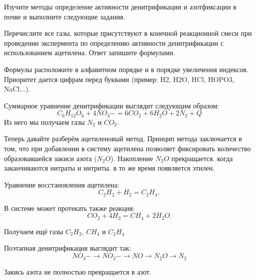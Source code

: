 
Изучите методы определение активности денитрификации и азотфиксации в почве и выполните следующие задания.

Перечислите все газы, которые присутствуют в конечной реакционной смеси при проведении экспермента по определению активности денитрификации с использованием ацетилена. Ответ запишите формулами.

Формулы расположите в алфавитном порядке и в порядке увеличения индексов. Приоритет дается цифрам перед буквами (пример: H2, H2O, HCl, HOPO3, NaCl...).

\explanationSection

Суммарное уравнение денитрификации выглядит следующим образом:
$$C_6H_{12}O_6 + 4NO_3- = 6CO_2 + 6H_2O + 2N_2 + Q$$
Из него мы получаем газы $N_2$ и $CO_2$.

Теперь давайте разберём ацетиленовый метод. Принцип метода заключается в том, что при добавлении в систему ацетилена позволяет фиксировать количество образовавшейся закиси азота ($N_2O$). Накопление $N_2O$ прекращается. когда заканчиваются нитраты и нитриты. в то же время появляется этилен. 

Уравнение восстановления ацетилена:
$$C_2H_2+H_2=C_2H_4, $$

В системе может протекать также реакция:
$$CO_2+4H_2=CH_4+2H_2O.$$

Получаем ещё газы $C_2H_2$, $CH_4$ и $C_2H_4$

Поэтапная денитрификация выглядит так:
$$NO_3- \rightarrow NO_2-  \rightarrow NO  \rightarrow N_2O  \rightarrow N_2$$

Закись азота не полностью превращается в азот.

